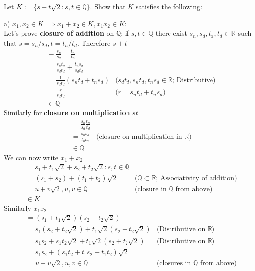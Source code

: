 \documentclass[boxes, qed]{homework}
\begin{document}
\newenvironment{amatrix}[1]{%
  \left[\begin{array}{@{}*{#1}{c}|c@{}}
}{%
  \end{array}\right]
}

\newenvironment{augmatrix}[1]{%
  \left[\begin{array}{#1}
}{%
  \end{array}\right]
}
\begin{problem}Let $K:=\{s+t\sqrt{2}:s,t\in{\mathbb{Q}}\}$.
  Show that $K$ satisfies the following:
\end{problem}
\begin{solution}
  a) $x_1,x_2\in{K} \implies x_1+x_2\in{K},x_1x_2\in{K}$:\\
  
  Let's prove \textbf{closure of addition} on $\mathbb{Q}$: 
  if $s,t\in\mathbb{Q}$ there exist $s_n,s_d,t_n,t_d\in\mathbb{R}$
  such that $s=s_n/s_d, t=t_n/t_d$. Therefore $s+t$
  \begin{align*}
    &= \frac{s_n}{s_d} + \frac{t_n}{t_d}\\
    &= \frac{s_nt_d}{s_dt_d} + \frac{t_ns_d}{s_dt_d}\\
    &= \frac{1}{s_dt_d} (s_nt_d+ t_ns_d)
      & \text{($s_dt_d,s_nt_d,t_ns_d\in\mathbb{R}$; Distributive)}\\
    &= \frac{r}{s_dt_d} 
      & \text{($r=s_nt_d+ t_ns_d$)}\\
    & \in \mathbb{Q}
  \end{align*}
  Similarly for \textbf{closure on multiplication} $st$
  \begin{align*}
    &= \frac{s_n}{s_d} \frac{t_n}{t_d}\\
    &= \frac{s_ns_d}{t_nt_d}
    & \text{(closure on multiplication in $\mathbb{R}$)}\\
    & \in \mathbb{Q}
  \end{align*}
  We can now write $x_1+x_2$
  \begin{align*}
    &= s_1+t_1\sqrt{2} +s_2+t_2\sqrt{2}
      :s,t\in \mathbb{Q}\\
    &= (s_1+s_2) + (t_1+t_2)\sqrt{2}
      & \text{($\mathbb{Q}\subset\mathbb{R}$; Associativity of addition)}\\
    &= u+v\sqrt{2}, u,v\in\mathbb{Q}
      & \text{(closure in $\mathbb{Q}$ from above)}\\
    & \in{K}
  \end{align*}
  Similarly $x_1x_2$
  \begin{align*}
    &= (s_1+t_1\sqrt{2})(s_2+t_2\sqrt{2})\\
    &= s_1(s_2+t_2\sqrt{2}) + t_1\sqrt{2}(s_2+t_2\sqrt{2})
      & \text{(Distributive on $\mathbb{R}$)}\\
    &= s_1s_2 + s_1t_2\sqrt{2} + t_1\sqrt{2}(s_2+t_2\sqrt{2})
      & \text{(Distributive on $\mathbb{R}$)}\\
    &= s_1s_2 + (s_1t_2 + t_1s_2 + t_1t_2)\sqrt{2}\\
    &= u+v\sqrt{2}, u,v\in\mathbb{Q}
      & \text{(closures in $\mathbb{Q}$ from above)}\\
  \end{align*}
\end{solution}
\end{document}
